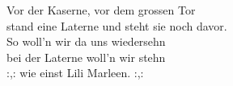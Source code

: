 
            Vor der Kaserne, vor dem grossen Tor \\
            stand eine Laterne und steht sie noch davor. \\
            So woll’n wir da uns wiedersehn \\
            bei der Laterne woll’n wir stehn \\
            :,: wie einst Lili Marleen. :,: \\
